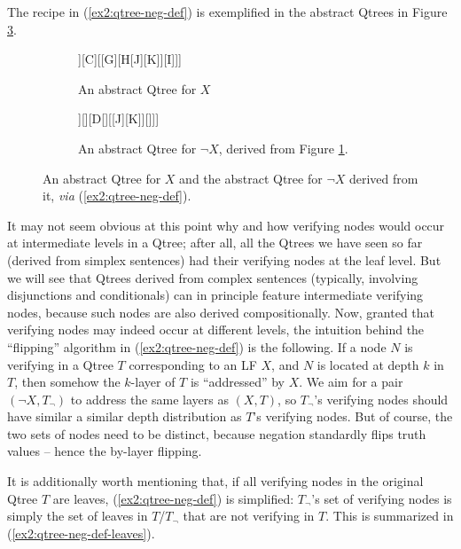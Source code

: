 The recipe in (\ref{ex2:qtree-neg-def}) is exemplified in the abstract Qtrees in Figure \ref{fig2:qtree-x-neg-x}. 

\begin{figure}[H]
	\centering
	\begin{subfigure}[t]{.45\linewidth}
		\centering
		\begin{forest}
			[A[\fbox{B}[\fbox{E}][\fbox{F}]][C][[G][H[J][K]][I]]]
		\end{forest}
		\caption{An abstract Qtree for $X$}\label{fig2:qtree-x}
	\end{subfigure}
	\hfill
	\begin{subfigure}[t]{.45\linewidth}
		\centering
		\begin{forest}
			[A[{B}[{E}][{F}]][][{D}[][[J][K]][]]]
		\end{forest}
		\caption{An abstract Qtree for $\neg X$, derived from Figure \ref{fig2:qtree-x}.}\label{fig2:qtree-neg-x}
	\end{subfigure}
	\caption{An abstract Qtree for $X$ and the abstract Qtree for $\neg X$ derived from it, \textit{via} (\ref{ex2:qtree-neg-def}).}\label{fig2:qtree-x-neg-x}
\end{figure}


It may not seem obvious at this point why and how verifying nodes would occur at intermediate levels in a Qtree; after all, all the Qtrees we have seen so far (derived from simplex sentences) had their verifying nodes at the leaf level. But we will see that Qtrees derived from complex sentences (typically, involving disjunctions and conditionals) can in principle feature intermediate verifying nodes, because such nodes are also derived compositionally.
Now, granted that verifying nodes may indeed occur at different levels, the intuition behind the ``flipping'' algorithm in (\ref{ex2:qtree-neg-def}) is the following. If a node $N$ is verifying in a Qtree $T$ corresponding to an LF $X$, and $N$ is located at depth $k$ in $T$, then somehow the $k$-layer of $T$ is ``addressed'' by $X$. We aim for a pair $(\neg X, T_\neg)$ to address the same layers as $(X, T)$, so $T_\neg$'s verifying nodes should have similar a similar depth distribution as $T$'s verifying nodes. But of course, the two sets of nodes need to be distinct, because negation standardly flips truth values -- hence the by-layer flipping.

It is additionally worth mentioning that, if all verifying nodes in the original Qtree $T$ are leaves, (\ref{ex2:qtree-neg-def}) is simplified: $T_\neg$'s set of verifying nodes is simply the set of leaves in $T$/$T_\neg$ that are not verifying in $T$. This is summarized in (\ref{ex2:qtree-neg-def-leaves}).

